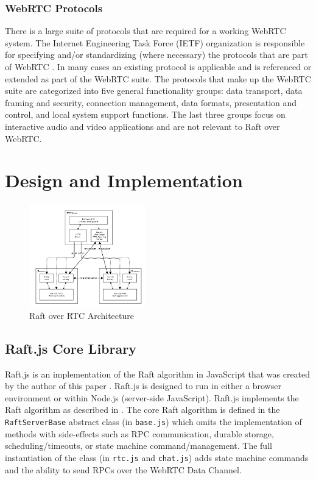 \documentclass[conference,compsoc]{./IEEEtran/IEEEtran}
\begin{document}
\subsubsection{WebRTC Protocols}

There is a large suite of protocols that are required for a working WebRTC system. The Internet Engineering Task Force (IETF) organization is responsible for specifying and/or standardizing (where necessary) the protocols that are part of WebRTC \cite{draft-rtcweb-overview} \cite{draft-rtcweb-security-arch} \cite{draft-rtcweb-security}. In many cases an existing protocol is applicable and is referenced or extended as part of the WebRTC suite. The protocols that make up the WebRTC suite are categorized into five general functionality groups: data transport, data framing and security, connection management, data formats, presentation and control, and local system support functions. The last three groups focus on interactive audio and video applications and are not relevant to Raft over WebRTC.

\section{Design and Implementation}

\begin{figure}[!t]
  \centerline{\includegraphics[width=0.45\textwidth]{imgs/raft_rtc_architecture}}
  \caption{Raft over RTC Architecture}
    \label{fig:raft_rtc_architecture}
\end{figure}

\subsection{Raft.js Core Library}

Raft.js is an implementation of the Raft algorithm in JavaScript that was created by the author of this paper \cite{raft.js}.  Raft.js is designed to run in either a browser environment or within Node.js (server-side JavaScript). Raft.js implements the Raft algorithm as described in \cite[Consensus:~Diego]{raft_thesis:ongaro14}. The core Raft algorithm is defined in the \texttt{RaftServerBase} abstract class (in \texttt{base.js}) which omits the implementation of methods with side-effects such as RPC communication, durable storage, scheduling/timeouts, or state machine command/management. The full instantiation of the class (in \texttt{rtc.js} and \texttt{chat.js}) adds state machine commands and the ability to send RPCs over the WebRTC Data Channel.
\end{document}
